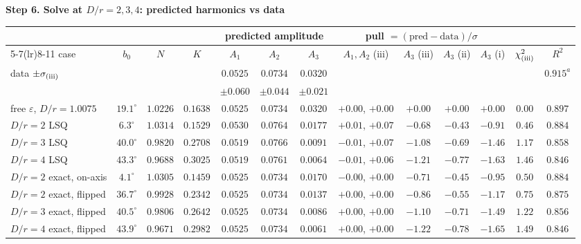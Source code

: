 \documentclass[10pt]{article}
\begin{document}
\medskip\textbf{Step 6. Solve at $D/r=2,3,4$: predicted harmonics vs data}
\begin{center}\footnotesize\setlength{\tabcolsep}{3.0pt}
\begin{tabular}{lcccccccccccc}\toprule
 & & & & \multicolumn{3}{c}{predicted amplitude} & \multicolumn{4}{c}{pull $=(\text{pred}-\text{data})/\sigma$} & & \\\cmidrule(lr){5-7}\cmidrule(lr){8-11}
case & $b_0$ & $N$ & $K$ & $A_1$ & $A_2$ & $A_3$ & $A_1,A_2$ (iii) & $A_3$ (iii) & $A_3$ (ii) & $A_3$ (i) & $\chi^2_{\rm (iii)}$ & $R^2$\\\midrule
data $\pm\sigma_{\rm (iii)}$ & & & & $0.0525$ & $0.0734$ & $0.0320$ & & & & & & $0.915^{a}$\\
 & & & & $\pm0.060$ & $\pm0.044$ & $\pm0.021$ & & & & & & \\\midrule

free $\varepsilon$, $D/r=1.0075$ & $19.1^\circ$ & $1.0226$ & $0.1638$ & $0.0525$ & $0.0734$ & $0.0320$ & $+0.00$, $+0.00$ & $+0.00$ & $+0.00$ & $+0.00$ & $0.00$ & $0.897$\\
$D/r=2$ LSQ & $6.3^\circ$ & $1.0314$ & $0.1529$ & $0.0530$ & $0.0764$ & $0.0177$ & $+0.01$, $+0.07$ & $-0.68$ & $-0.43$ & $-0.91$ & $0.46$ & $0.884$\\
$D/r=3$ LSQ & $40.0^\circ$ & $0.9820$ & $0.2708$ & $0.0519$ & $0.0766$ & $0.0091$ & $-0.01$, $+0.07$ & $-1.08$ & $-0.69$ & $-1.46$ & $1.17$ & $0.858$\\
$D/r=4$ LSQ & $43.3^\circ$ & $0.9688$ & $0.3025$ & $0.0519$ & $0.0761$ & $0.0064$ & $-0.01$, $+0.06$ & $-1.21$ & $-0.77$ & $-1.63$ & $1.46$ & $0.846$\\
\midrule

$D/r=2$ exact, on-axis & $4.1^\circ$ & $1.0305$ & $0.1459$ & $0.0525$ & $0.0734$ & $0.0170$ & $-0.00$, $+0.00$ & $-0.71$ & $-0.45$ & $-0.95$ & $0.50$ & $0.884$\\
$D/r=2$ exact, flipped & $36.7^\circ$ & $0.9928$ & $0.2342$ & $0.0525$ & $0.0734$ & $0.0137$ & $+0.00$, $+0.00$ & $-0.86$ & $-0.55$ & $-1.17$ & $0.75$ & $0.875$\\
$D/r=3$ exact, flipped & $40.5^\circ$ & $0.9806$ & $0.2642$ & $0.0525$ & $0.0734$ & $0.0086$ & $+0.00$, $+0.00$ & $-1.10$ & $-0.71$ & $-1.49$ & $1.22$ & $0.856$\\
$D/r=4$ exact, flipped & $43.9^\circ$ & $0.9671$ & $0.2982$ & $0.0525$ & $0.0734$ & $0.0061$ & $+0.00$, $+0.00$ & $-1.22$ & $-0.78$ & $-1.65$ & $1.49$ & $0.846$\\
\midrule


\end{tabular}
\end{center}
\end{document}
